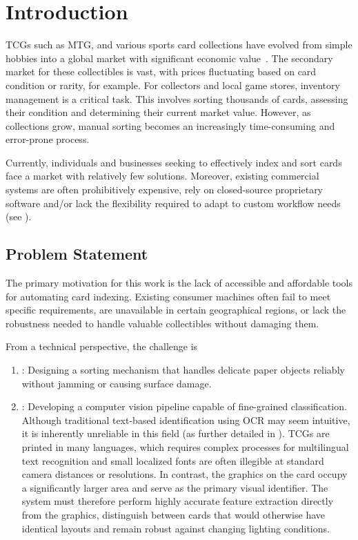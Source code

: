 
\chapter{Introduction}\label{chap:introduction}

\acp{TCG} such as \ac{MTG},  and various sports card collections have evolved from simple hobbies into a global market with significant economic value~\cite{weber2021exploring}. The secondary market for these collectibles is vast, with prices fluctuating based on card condition or rarity, for example. For collectors and local game stores, inventory management is a critical task. This involves sorting thousands of cards, assessing their condition and determining their current market value. However, as collections grow, manual sorting becomes an increasingly time-consuming and error-prone process.

Currently, individuals and businesses seeking to effectively index and sort cards face a market with relatively few solutions. Moreover, existing commercial systems are often prohibitively expensive, rely on closed-source proprietary software and/or lack the flexibility required to adapt to custom workflow needs (see ).

\section{Problem Statement}
The primary motivation for this work is the lack of accessible and affordable tools for automating card indexing. Existing consumer machines often fail to meet specific requirements, are unavailable in certain geographical regions, or lack the robustness needed to handle valuable collectibles without damaging them. 

\noindent
From a technical perspective, the challenge is
\begin{enumerate}
    \item {}: Designing a sorting mechanism that handles delicate paper objects reliably without jamming or causing surface damage.
    \item {}: Developing a computer vision pipeline capable of fine-grained classification. Although traditional text-based identification using \ac{OCR} may seem intuitive, it is inherently unreliable in this field (as further detailed in ). \acp{TCG} are printed in many languages, which requires complex processes for multilingual text recognition and small localized fonts are often illegible at standard camera distances or resolutions. In contrast, the graphics on the card occupy a significantly larger area and serve as the primary visual identifier. The system must therefore perform highly accurate feature extraction directly from the graphics, distinguish between cards that would otherwise have identical layouts and remain robust against changing lighting conditions.
\end{enumerate}

